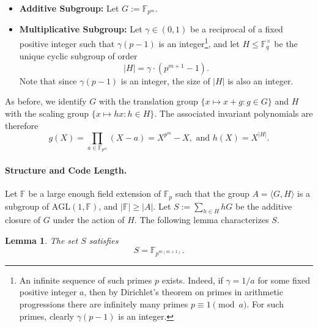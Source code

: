 \documentclass[11pt]{article}
\theoremstyle{plain}
\newtheorem{lemma}[theorem]{Lemma}
\theoremstyle{definition}
\newcommand{\abs}[1]{\left|#1\right|}
\begin{document}
\begin{itemize}
    \item \textbf{Additive Subgroup:} Let $G:=\mathbb F_{p^m}$.

    \item \textbf{Multiplicative Subgroup:}
Let $\gamma\in (0,1)$ be a reciprocal of a fixed positive integer such that $\gamma(p-1)$ is an integer\footnote{An infinite sequence of such primes $p$  exists. Indeed,  if $\gamma=1/a$ for some fixed positive integer $a$, then by 
Dirichlet’s theorem on primes in arithmetic progressions there are  infinitely many primes 
$p\equiv 1 \pmod{a}$. For such primes, clearly $\gamma(p-1)$ is an integer.
}, and let $H\le \mathbb F_q^\times$ be the unique cyclic subgroup of order
\[
|H| = \gamma\cdot (p^{m+1}-1).
\]
Note that since $\gamma(p-1)$ is an integer, the size of $|H|$ is also an integer.
\end{itemize}
 As before, we identify $G$ with the translation group
$\{x\mapsto x+g : g\in G\}$ and $H$ with the scaling group
$\{x\mapsto hx : h\in H\}$. The associated invariant polynomials are therefore
\[
g(X)=\prod_{a\in \mathbb F_{p^m}} (X-a)=X^{p^m}-X, \text{ and }
h(X)=X^{|H|}.
\]






\paragraph{Structure and Code Length.}
Let $\mathbb{F}$ be a large enough field extension of $\mathbb{F}_p$ such that the group 
$A = \langle G, H \rangle$ is a subgroup of 
$\mathrm{AGL}(1,\mathbb{F})$, and $\abs{\mathbb{F}}\geq \abs{A}.$
Let 
$
S:=\sum_{h\in H} hG$ be the additive 
closure of $G$ under the action of $H$. 
The following lemma characterizes $S.$




\begin{lemma}
\label{lem:S-second}
The set $S$ satisfies \[
S = \mathbb F_{p^{m(m+1)}}.
\]
\end{lemma}
\end{document}
